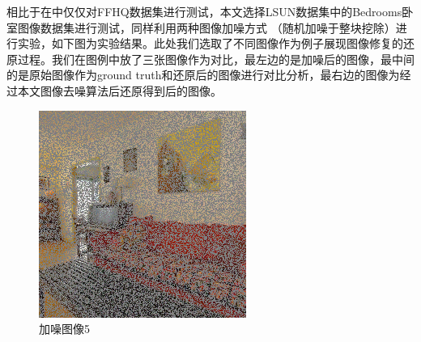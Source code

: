 相比于在\cite{Inverse}中仅仅对FFHQ数据集进行测试，本文选择LSUN数据集中的Bedrooms卧室图像数据集进行测试，同样利用两种图像加噪方式 （随机加噪于整块挖除）进行实验，如下图为实验结果。此处我们选取了不同图像作为例子展现图像修复的还原过程。我们在图例中放了三张图像作为对比，最左边的是加噪后的图像，最中间的是原始图像作为ground truth和还原后的图像进行对比分析，最右边的图像为经过本文图像去噪算法后还原得到后的图像。 
\begin{figure}[H]
  \centering
  \begin{minipage}[b]{0.3\linewidth}
\includegraphics[width=\linewidth]{Picture/input/00007.png}
    \caption{加噪图像5}
    \label{noised image 5 }
  \end{minipage}
  \hspace{0.1cm} %
   \begin{minipage}[b]{0.3\linewidth}

\end{minipage}
\end{figure}

